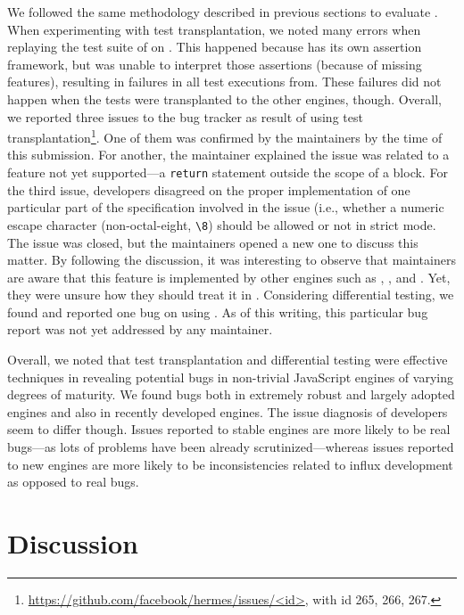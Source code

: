 \documentclass[smallextended]{svjour3}
\begin{document}
We followed the same methodology described in previous sections to
evaluate \hermes. When experimenting with test transplantation, we
noted many errors when replaying the test suite of \smonkey on
\hermes. This happened because \smonkey has its own assertion
framework, but \hermes was unable to interpret those assertions
(because of missing features), resulting in failures in all test
executions from. These failures did not happen when the \smonkey tests
were transplanted to the other engines, though.  Overall, we reported
three issues to the \hermes bug tracker as result of using test
transplantation\footnote{\url{https://github.com/facebook/hermes/issues/<id>},
  with id 265, 266, 267.}. One of them was confirmed by the \hermes
maintainers by the time of this submission. For another, the
maintainer explained the issue was related to a feature not yet
supported---a \texttt{return} statement outside the scope of a
block. For the third issue, developers disagreed on the proper
implementation of one particular part of the specification involved in
the issue (i.e., whether a numeric escape character (non-octal-eight,
\texttt{\textbackslash{8}}) should be allowed or not in strict
mode. The issue was closed, but the maintainers opened a new one to
discuss this matter. By following the discussion, it was interesting
to observe that maintainers are aware that this feature is implemented
by other engines such as \veight, \chakra, and \smonkey. Yet, they
were unsure how they should treat it in \hermes.  Considering
differential testing, we found and reported one bug on \hermes using
\radamsa. As of this writing, this particular bug report was not yet
addressed by any \hermes maintainer.

Overall, we noted that test transplantation and differential testing
were effective techniques in revealing potential bugs in non-trivial
JavaScript engines of varying degrees of maturity. We found bugs both
in extremely robust and largely adopted engines and also in recently
developed engines. The issue diagnosis of
developers seem to differ though. Issues reported to stable engines
are more likely to be real bugs---as lots of problems have been
already scrutinized---whereas issues reported to new engines are more
likely to be inconsistencies related to influx development as opposed
to real bugs.

\section{Discussion}
\end{document}
